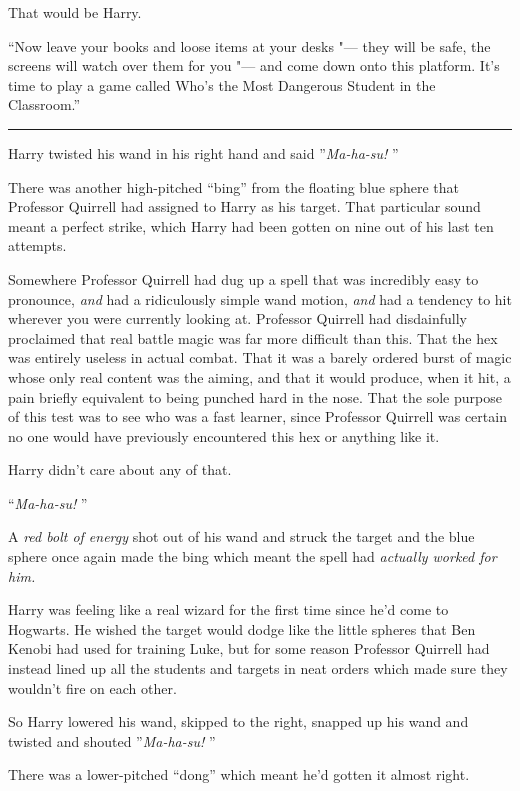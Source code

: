 That would be Harry.

``Now leave your books and loose items at your desks "--- they will be
safe, the screens will watch over them for you "--- and come down onto this
platform. It's time to play a game called Who's the Most Dangerous
Student in the Classroom.''

\begin{center}\rule{3in}{0.4pt}\end{center}

Harry twisted his wand in his right hand and said ''\emph{Ma-ha-su!} ''

There was another high-pitched ``bing'' from the floating blue sphere
that Professor Quirrell had assigned to Harry as his target. That
particular sound meant a perfect strike, which Harry had been gotten on
nine out of his last ten attempts.

Somewhere Professor Quirrell had dug up a spell that was incredibly easy
to pronounce, \emph{and} had a ridiculously simple wand motion,
\emph{and} had a tendency to hit wherever you were currently looking at.
Professor Quirrell had disdainfully proclaimed that real battle magic
was far more difficult than this. That the hex was entirely useless in
actual combat. That it was a barely ordered burst of magic whose only
real content was the aiming, and that it would produce, when it hit, a
pain briefly equivalent to being punched hard in the nose. That the sole
purpose of this test was to see who was a fast learner, since Professor
Quirrell was certain no one would have previously encountered this hex
or anything like it.

Harry didn't care about any of that.

``\emph{Ma-ha-su!} ''

A \emph{red bolt of energy} shot out of his wand and struck the target
and the blue sphere once again made the bing which meant the spell had
\emph{actually worked for him.}

Harry was feeling like a real wizard for the first time since he'd come
to Hogwarts. He wished the target would dodge like the little spheres
that Ben Kenobi had used for training Luke, but for some reason
Professor Quirrell had instead lined up all the students and targets in
neat orders which made sure they wouldn't fire on each other.

So Harry lowered his wand, skipped to the right, snapped up his wand and
twisted and shouted ''\emph{Ma-ha-su!} ''

There was a lower-pitched ``dong'' which meant he'd gotten it almost
right.

